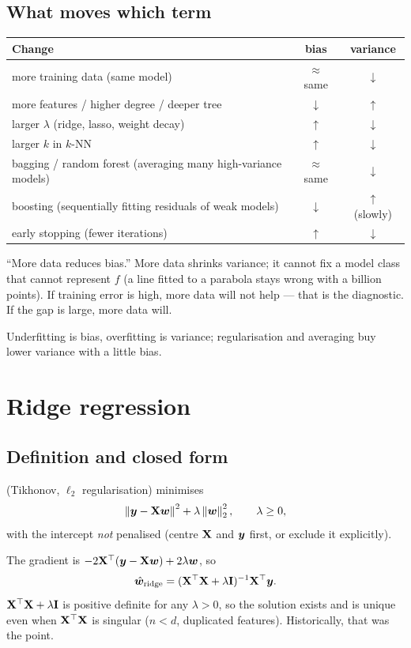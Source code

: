 \subsection{What moves which term}
\begin{center}
	\small
	\begin{tabularx}{\linewidth}{>{\raggedright\arraybackslash}X cc}
		\toprule
		Change & bias & variance \\
		\midrule
		more training data (same model) & $\approx$ same & $\downarrow$ \\
		more features / higher degree / deeper tree & $\downarrow$ & $\uparrow$ \\
		larger $\lambda$ (ridge, lasso, weight decay) & $\uparrow$ & $\downarrow$ \\
		larger $k$ in $k$-NN & $\uparrow$ & $\downarrow$ \\
		bagging / random forest (averaging many high-variance models) & $\approx$ same & $\downarrow$ \\
		boosting (sequentially fitting residuals of weak models) & $\downarrow$ & $\uparrow$ (slowly)\\
		early stopping (fewer iterations) & $\uparrow$ & $\downarrow$ \\
		\bottomrule
	\end{tabularx}
\end{center}

\begin{remark}
	\trap ``More data reduces bias.'' More data shrinks variance; it cannot fix a model class that
	cannot represent $f$ (a line fitted to a parabola stays wrong with a billion points). If
	training error is high, more data will not help --- that is the diagnostic. If the gap is
	large, more data will.
\end{remark}

\begin{moral}
	Underfitting is bias, overfitting is variance; regularisation and averaging buy lower variance
	with a little bias.
\end{moral}

\section{Ridge regression}

\subsection{Definition and closed form}
\begin{definition}
	 (Tikhonov, $\ell_2$ regularisation) minimises
	\[ \left\lVert {\bm{y}}-{\mathbf{X}}{\bm{w}} \right\rVert^2+\lambda\left\lVert {\bm{w}} \right\rVert_2^2,\qquad\lambda\ge0, \]
	with the intercept \emph{not} penalised (centre ${\mathbf{X}}$ and ${\bm{y}}$ first, or exclude it explicitly).
\end{definition}
The gradient is $-2{\mathbf{X}}^{\top}({\bm{y}}-{\mathbf{X}}{\bm{w}})+2\lambda{\bm{w}}$, so
\[ \hat{{\bm{w}}}_{\text{ridge}}=({\mathbf{X}}^{\top}{\mathbf{X}}+\lambda{\mathbf{I}})^{-1}{\mathbf{X}}^{\top}{\bm{y}}. \]
${\mathbf{X}}^{\top}{\mathbf{X}}+\lambda{\mathbf{I}}$ is positive definite for any $\lambda>0$, so the solution exists and is unique
even when ${\mathbf{X}}^{\top}{\mathbf{X}}$ is singular ($n<d$, duplicated features). Historically, that was the point.

